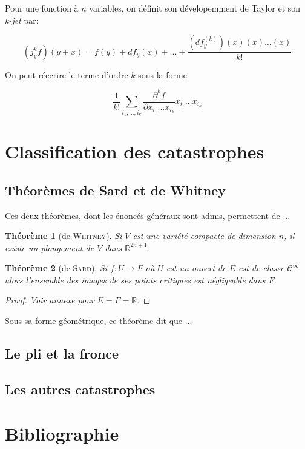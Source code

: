 \documentclass{article}
\newcommand{\cinf}{\mathcal{C}^\infty}
\newcommand{\R}{\mathbb{R}}
\newtheorem{thm}{Théorème}
\theoremstyle{definition}
\begin{document}
Pour une fonction à $n$ variables, on définit son dévelopemment de Taylor et son \textit{k-jet} par:

$$(j^k_y f)(y+x) = f(y) + df_y(x)+...+\frac{(df^{(k)}_y)(x)(x)...(x)}{k!}$$

On peut réecrire le terme d'ordre $k$ sous la forme

$$\frac{1}{k!}\sum_{i_1,...,i_k} \frac{\partial^k f}{\partial x_{i_1}...x_{i_k}} x_{i_1}...x_{i_k}$$

\section{Classification des catastrophes}
\subsection{Théorèmes de Sard et de Whitney}

Ces deux théorèmes, dont les énoncés généraux sont admis, permettent de ...

\begin{thm}[de \textsc{Whitney}]
	Si $V$ est une variété compacte de dimension $n$, il existe un plongement de $V$ dans $\R^{2n+1}$.
\end{thm}

\begin{thm}[de \textsc{Sard}]
	Si $f: U\to F$ où $U$ est un ouvert de $E$ est de classe $\cinf$ alors l'ensemble des images de ses points critiques est négligeable dans $F$.
\end{thm}

\begin{proof}
	\textit{Voir annexe pour $E=F=\R$}.
\end{proof}

Sous sa forme géométrique, ce théorème dit que ...

\subsection{Le pli et la fronce}
\subsection{Les autres catastrophes}

\section{Bibliographie}

\renewcommand\refname{\vskip -1cm}


\end{document}
